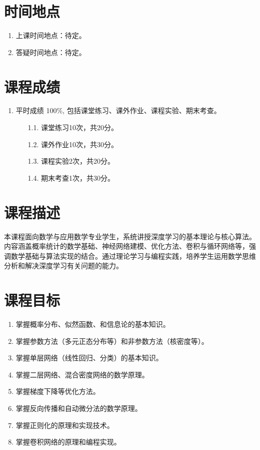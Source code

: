 \documentclass[10pt,a4paper]{article}
\begin{document}
\section*{时间地点}
\begin{enumerate}
\itemsep0em 
\item 上课时间地点：待定。
\item 答疑时间地点：待定。
\end{enumerate}

\section*{课程成绩}
\begin{enumerate}
\item  平时成绩 100\%, 包括课堂练习、课外作业、课程实验、期末考查。
\begin{enumerate}\itemsep0em 
\item[1.1.] 课堂练习10次，共20分。
\item[1.2.] 课外作业10次，共30分。
\item[1.3.] 课程实验2次，共20分。
\item[1.4.] 期末考查1次，共30分。
\end{enumerate}


\end{enumerate}

\section*{课程描述}

本课程面向数学与应用数学专业学生，系统讲授深度学习的基本理论与核心算法。内容涵盖概率统计的数学基础、神经网络建模、优化方法、卷积与循环网络等，强调数学基础与算法实现的结合。通过理论学习与编程实践，培养学生运用数学思维分析和解决深度学习有关问题的能力。

\section*{课程目标}

\begin{enumerate}\itemsep0em 

\item 掌握概率分布、似然函数、和信息论的基本知识。
\item 掌握参数方法（多元正态分布等）和非参数方法（核密度等）。
\item 掌握单层网络（线性回归、分类）的基本知识。
\item 掌握二层网络、混合密度网络的数学原理。
\item 掌握梯度下降等优化方法。
\item 掌握反向传播和自动微分法的数学原理。
\item 掌握正则化的原理和实现技术。
\item 掌握卷积网络的原理和编程实现。

\end{enumerate}
\end{document}

